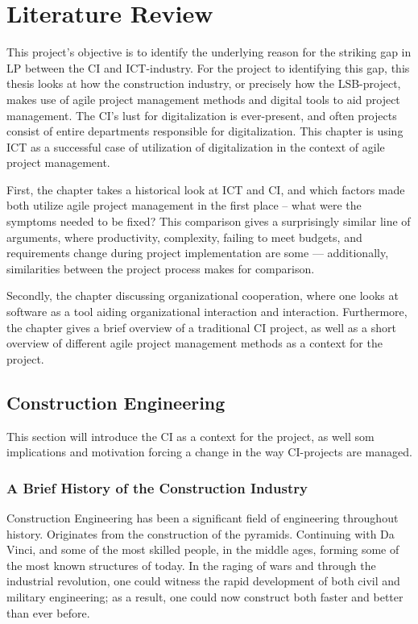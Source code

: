 
\chapter{Literature Review} \label{chp:litterature} 
This project's objective is to identify the underlying reason for the striking gap in LP between the CI and ICT-industry. For the project to identifying this gap, this thesis looks at how the construction industry, or precisely how the LSB-project, makes use of agile project management methods and digital tools to aid project management. The CI's lust for digitalization is ever-present, and often projects consist of entire departments responsible for digitalization. This chapter is using ICT as a successful case of utilization of digitalization in the context of agile project management. 

First, the chapter takes a historical look at ICT and CI, and which factors made both utilize agile project management in the first place – what were the symptoms needed to be fixed? This comparison gives a surprisingly similar line of arguments, where productivity, complexity, failing to meet budgets, and requirements change during project implementation are some — additionally, similarities between the project process makes for comparison. 

Secondly, the chapter discussing organizational cooperation, where one looks at software as a tool aiding organizational interaction and interaction. Furthermore, the chapter gives a brief overview of a traditional CI project, as well as a short overview of different agile project management methods as a context for the project.

\section{Construction Engineering}
This section will introduce the CI as a context for the project, as well som implications and motivation forcing a change in the way CI-projects are managed. 

\subsection{A Brief History of the Construction Industry}
Construction Engineering has been a significant field of engineering throughout history. Originates from the construction of the pyramids. Continuing with Da Vinci, and some of the most skilled people, in the middle ages, forming some of the most known structures of today. In the raging of wars and through the industrial revolution, one could witness the rapid development of both civil and military engineering; as a result, one could now construct both faster and better than ever before.

